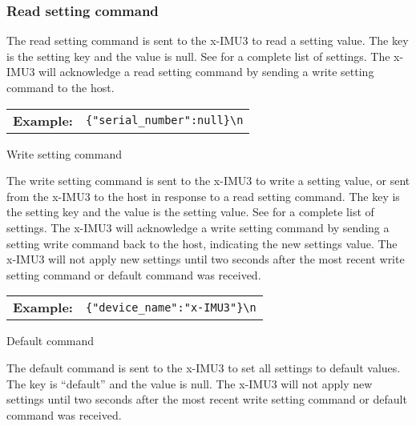 \newcommand{\commandMessageExample}[2]{
    \begin{table}[H]
        \def\arraystretch{1.5}
        \begin{tabular}{l l}
            \textbf{Example:} & \texttt{\{#1\}\textbackslash n}
        \end{tabular}
    \end{table}
}

\subsubsection{Read setting command}

The read setting command is sent to the x-IMU3 to read a setting value.  The key is the setting key and the value is null.  See  for a complete list of settings.  The x-IMU3 will acknowledge a read setting command by sending a write setting command to the host.

\commandMessageExample{"serial\_number":null}

\subsubsection{Write setting command}

The write setting command is sent to the x-IMU3 to write a setting value, or sent from the x-IMU3 to the host in response to a read setting command.  The key is the setting key and the value is the setting value.  See  for a complete list of settings.  The x-IMU3 will acknowledge a write setting command by sending a setting write command back to the host, indicating the new settings value.  The x-IMU3 will not apply new settings until two seconds after the most recent write setting command or default command was received.

\commandMessageExample{"device\_name":"x-IMU3"}

\subsubsection{Default command}

The default command is sent to the x-IMU3 to set all settings to default values.  The key is \enquote{default} and the value is null.  The x-IMU3 will not apply new settings until two seconds after the most recent write setting command or default command was received.



